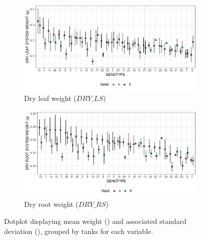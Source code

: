 \begin{figure}
\centering
	\begin{subfigure}[t]{\textwidth}
	\label{fig:desc_stat_DRY_LS}
		\centering
		\includegraphics[width = \textwidth]{../../Figures/DRY_LS_summary_plot.pdf}
		\caption{Dry leaf weight ($DRY\_LS$)}
			\end{subfigure}

	\begin{subfigure}[t]{\textwidth}
		\centering
		\includegraphics[width = \textwidth]{../../Figures/DRY_RS_summary_plot.pdf}
		\caption{Dry root weight ($DRY\_RS$)}
	\end{subfigure}
	\caption[Dotplot of the mean weight and associated standard deviation]{Dotplot displaying mean weight (\protect\emptysquare) and associated standard deviation (\protect\blackline), grouped by tanks for each variable.}
\end{figure}
